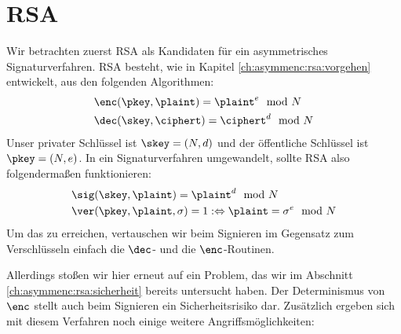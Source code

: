\section{RSA}
Wir betrachten zuerst RSA als Kandidaten für ein asymmetrisches Signaturverfahren. RSA besteht, wie in Kapitel \ref{ch:asymmenc:rsa:vorgehen} entwickelt,
aus den folgenden Algorithmen:
\begin{align*}
& \enc(\pkey, \plaint) = \plaint^e \mod N\\
& \dec(\skey, \ciphert) = \ciphert^d \mod N
\end{align*}
Unser privater Schlüssel ist $\skey = (N, d)$ und der öffentliche Schlüssel ist $\pkey = (N, e)$. In ein Signaturverfahren umgewandelt, sollte RSA also folgendermaßen funktionieren:
\begin{align*}
& \sig(\skey, \plaint) = \plaint^d \mod N\\
& \ver(\pkey, \plaint, \sigma) = 1 : \Leftrightarrow \plaint = \sigma^e \mod N 
\end{align*}
Um das zu erreichen, vertauschen wir beim Signieren im Gegensatz zum Verschlüsseln einfach die $\dec$- und die $\enc$-Routinen.

Allerdings stoßen wir hier erneut auf ein Problem, das wir im Abschnitt \ref{ch:asymmenc:rsa:sicherheit} bereits untersucht haben. Der Determinismus von $\enc$ stellt auch beim Signieren ein Sicherheitsrisiko dar. Zusätzlich ergeben sich mit diesem Verfahren noch einige weitere Angriffsmöglichkeiten:

